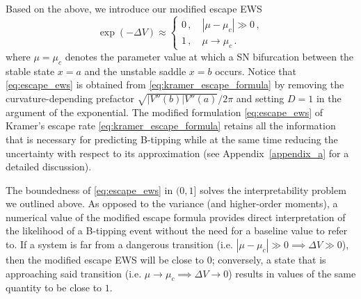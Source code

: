 \documentclass[10pt]{article}
\newcommand{\aref}[1]{Appendix~\ref{#1}}
\begin{document}
Based on the above, we introduce our modified escape EWS
%
\begin{equation}\label{eq:escape_ews}
        \exp(-\Delta V) \approx 
   \begin{cases}
       0\,, \quad |\mu - \mu_{c}| \gg 0\,,\\
       1\,, \quad \mu \to \mu_{c}\,. 
   \end{cases}
\end{equation}
%
where $\mu=\mu_c$ denotes the parameter value at which a SN bifurcation between the stable state $x=a$ and the unstable saddle $x=b$ occurs.
Notice that \eqref{eq:escape_ews} is obtained from \eqref{eq:kramer_escape_formula} by removing the curvature-depending prefactor $\sqrt{|V''(b)|V''(a)}/2\pi$ and setting $D=1$ in the argument of the exponential.
The modified formulation \eqref{eq:escape_ews} of Kramer's escape rate \eqref{eq:kramer_escape_formula} retains all the information that is necessary for predicting B-tipping while at the same time reducing the uncertainty with respect to its approximation (see \aref{appendix_a} for a detailed discussion).

The boundedness of \eqref{eq:escape_ews} in $(0,1]$ solves the interpretability problem we outlined above.
As opposed to the variance (and higher-order moments), a numerical value of the modified escape formula provides direct interpretation of the likelihood of a B-tipping event without the need for a baseline value to refer to.
If a system is far from a dangerous transition (i.e. $|\mu-\mu_c|\gg0\implies\Delta V\gg0$), then the modified escape EWS will be close to $0$; conversely, a state that is approaching said transition (i.e. $\mu\to\mu_c\implies\Delta V\to0$) results in values of the same quantity to be close to $1$.
\end{document}
